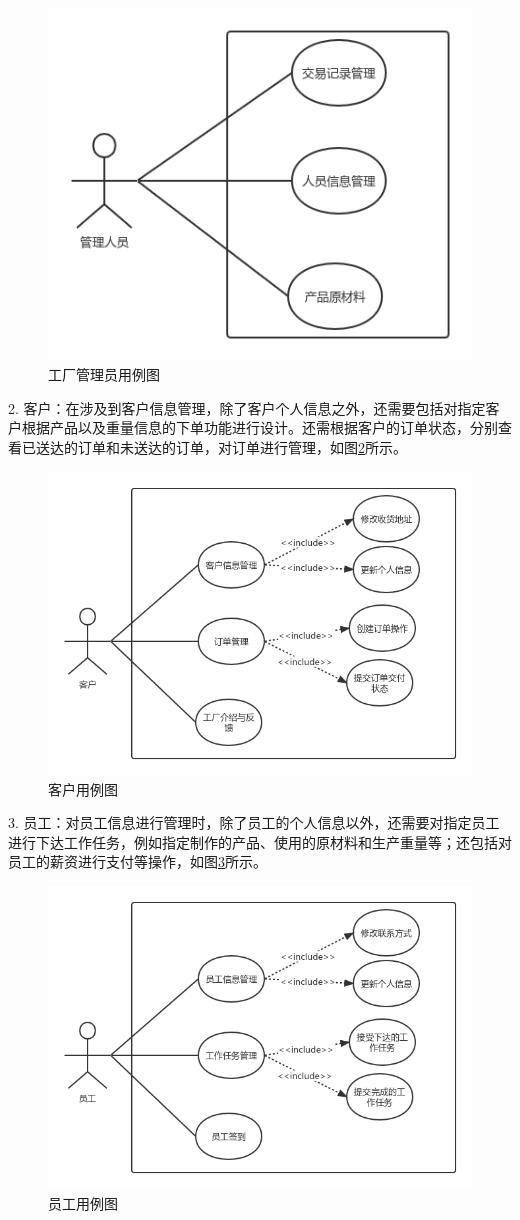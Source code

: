 \begin{figure}[H]
    \centering
    \includegraphics[width=.55\textwidth]{figures/3usecase.png}
    \caption{工厂管理员用例图}
    \label{fig:usecase}
\end{figure}

2. 客户：在涉及到客户信息管理，除了客户个人信息之外，还需要包括对指定客户根据产品以及重量信息的下单功能进行设计。还需根据客户的订单状态，分别查看已送达的订单和未送达的订单，对订单进行管理，如图\ref{fig:3cstmusecase}所示。

\begin{figure}[H]
    \centering
    \includegraphics[width=.75\textwidth]{figures/3cstmusecase.png}
    \caption{客户用例图}
    \label{fig:3cstmusecase}
\end{figure}

3. 员工：对员工信息进行管理时，除了员工的个人信息以外，还需要对指定员工进行下达工作任务，例如指定制作的产品、使用的原材料和生产重量等；还包括对员工的薪资进行支付等操作，如图\ref{fig:3empleusecase}所示。

\begin{figure}[H]
    \centering
    \includegraphics[width=.75\textwidth]{figures/3empleusecase.png}
    \caption{员工用例图}
    \label{fig:3empleusecase}
\end{figure}

